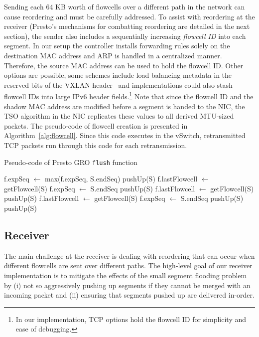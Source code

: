 Sending each 64 KB worth of flowcells over a different path in the network can cause reordering and must
be carefully addressed.
To assist with reordering at the receiver (Presto's mechanisms for combatting reordering are detailed in the next section), 
the sender also includes a sequentially increasing {\em flowcell ID} into each segment.
In our setup the controller installs forwarding rules solely on the destination MAC address and
ARP is handled in a centralized manner. Therefore,
the source MAC address can be used to hold the flowcell ID. Other options are possible, 
\eg{}some schemes include load balancing metadata in the reserved bits of the VXLAN header~\cite{nvo3}
and implementations could also stash flowcell IDs into large IPv6 header fields.\footnote{In our
implementation, TCP options hold the flowcell ID for simplicity and ease of debugging.}
Note that since the flowcell ID and the shadow MAC address are modified before a segment is handed to the NIC,
the TSO algorithm in the NIC replicates these values to all derived MTU-sized packets.
The pseudo-code of flowcell creation is presented in Algorithm~\ref{alg:flowcell}.
Since this code executes in the vSwitch, retransmitted TCP packets run through this code for each retransmission.

\begin{algorithm}[!t]
\caption{Pseudo-code of Presto GRO {\tt flush} function}
\label{alg:gro}
\begin{algorithmic}[1]
\STATE f.expSeq $\leftarrow$ max(f.expSeq, S.endSeq)
\STATE pushUp(S)
\STATE f.lastFlowcell $\leftarrow$ getFlowcell(S)
\STATE f.expSeq $\leftarrow$ S.endSeq
\STATE pushUp(S)
\STATE f.lastFlowcell $\leftarrow$ getFlowcell(S)
\STATE pushUp(S)
\STATE f.lastFlowcell $\leftarrow$ getFlowcell(S)
\STATE f.expSeq $\leftarrow$ S.endSeq
\STATE pushUp(S)
\ENDIF
\ELSE
\STATE pushUp(S)
\ENDIF
\ENDFOR
\ENDFOR
\end{algorithmic}
\end{algorithm}

\subsection{Receiver}
The main challenge at the receiver is dealing with reordering that can occur when different flowcells
are sent over different paths. The high-level goal of our receiver implementation is
to mitigate the effects of the small segment flooding problem by (i) not so aggressively pushing
up segments if they cannot be merged with an incoming packet and (ii) ensuring that segments
pushed up are delivered in-order.

